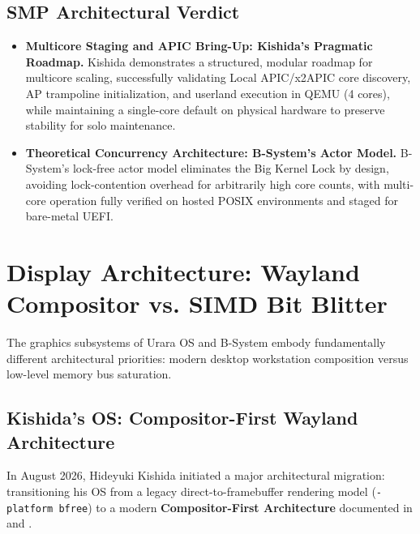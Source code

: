 \documentclass[10pt,journal,compsoc,twocolumn]{article}
\begin{document}
\subsection{SMP Architectural Verdict}
\begin{itemize}[leftmargin=*]
    \item \textbf{Multicore Staging and APIC Bring-Up: Kishida's Pragmatic Roadmap.} Kishida demonstrates a structured, modular roadmap for multicore scaling, successfully validating Local APIC/x2APIC core discovery, AP trampoline initialization, and userland execution in QEMU (4 cores), while maintaining a single-core default on physical hardware to preserve stability for solo maintenance.
    \item \textbf{Theoretical Concurrency Architecture: B-System's Actor Model.} B-System's lock-free actor model eliminates the Big Kernel Lock by design, avoiding lock-contention overhead for arbitrarily high core counts, with multi-core operation fully verified on hosted POSIX environments and staged for bare-metal UEFI.
\end{itemize}

\section{Display Architecture: Wayland Compositor vs. SIMD Bit Blitter}
\label{sec:blitter}

The graphics subsystems of Urara OS and B-System embody fundamentally different architectural priorities: modern desktop workstation composition versus low-level memory bus saturation.

\subsection{Kishida's OS: Compositor-First Wayland Architecture}
In August 2026, Hideyuki Kishida initiated a major architectural migration: transitioning his OS from a legacy direct-to-framebuffer rendering model (\texttt{-platform bfree}) to a modern \textbf{Compositor-First Architecture} documented in  and .
\end{document}
